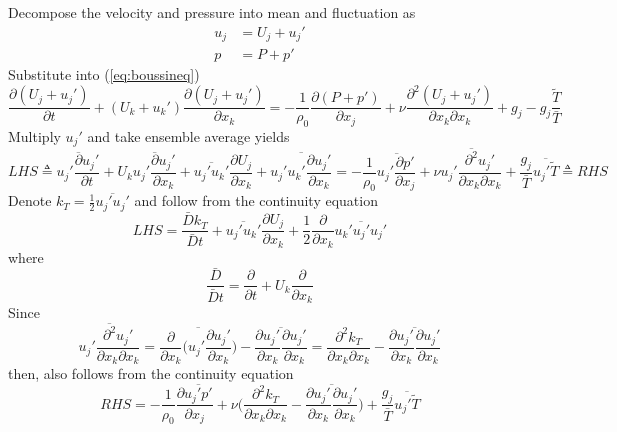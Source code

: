 \documentclass[paper=a4, fontsize=11pt]{scrartcl} %
\numberwithin{equation}{section} %
\numberwithin{figure}{section} %
\numberwithin{table}{section} %
\begin{document}
 	Decompose the velocity and pressure into mean and fluctuation as
 	\begin{equation}
 		\begin{aligned}
 			u_j & = U_j + u_j'\\
 			p & = P + p'
 		\end{aligned}
 	\end{equation}
 	Substitute into (\ref{eq:boussineq})
 	\begin{equation}
 		\frac{\partial (U_j + u_j')}{\partial t} + (U_k + u_k') \frac{\partial (U_j + u_j')}{\partial x_k} = - \frac{1}{\rho_0} \frac{\partial (P + p')}{\partial x_j} + \nu \frac{\partial^2 (U_j + u_j')}{\partial x_k \partial x_k} + g_j - g_j \frac{\tilde{T}}{\bar{T}}
 	\end{equation}
 	Multiply $u_j'$ and take ensemble average yields
 	\begin{equation}\label{eq:ea}
 		LHS \triangleq \overline{u_j' \frac{\partial u_j'}{\partial t}} + U_k \overline{u_j' \frac{\partial u_j'}{\partial x_k}} + \overline{u_j' u_k'}\frac{\partial U_j}{\partial x_k} + \overline{u_j' u_k' \frac{\partial u_j'}{\partial x_k}} = -\frac{1}{\rho_0} \overline{u_j' \frac{\partial p'}{\partial x_j}} + \nu \overline{u_j'\frac{\partial^2 u_j'}{\partial x_k \partial x_k}} + \frac{g_j}{\bar{T}}\overline{u_j' \tilde{T}} \triangleq RHS
 	\end{equation}
 	Denote $k_T = \frac{1}{2} \overline{u_j' u_j'}$ and follow from the continuity equation
 	\begin{equation}\label{eq:bl}
 		LHS = \frac{\bar{D}k_T}{\bar{D}t} + \overline{u_j' u_k'}\frac{\partial U_j}{\partial x_k} + \frac{1}{2}\frac{\partial}{\partial x_k}\overline{u_k' u_j' u_j'}
 	\end{equation}
	where
 	\begin{equation}
 	\frac{\bar{D}}{\bar{D}t} = \frac{\partial}{\partial t} + U_k \frac{\partial}{\partial x_k}
 	\end{equation}
 	Since
 	\begin{equation}
 		\overline{u_j'\frac{\partial^2 u_j'}{\partial x_k \partial x_k}} = \overline{\frac{\partial}{\partial x_k} \big(u_j'\frac{\partial u_j'}{\partial x_k}\big)} - \overline{\frac{\partial u_j'}{\partial x_k} \frac{\partial u_j'}{\partial x_k}} = \frac{\partial^2 k_T}{\partial x_k \partial x_k} - \overline{\frac{\partial u_j'}{\partial x_k} \frac{\partial u_j'}{\partial x_k}}
 	\end{equation}
 	then, also follows from the continuity equation
 	\begin{equation}\label{eq:br}
 		RHS = -\frac{1}{\rho_0} \frac{\partial \overline{u_j' p'}}{\partial x_j} + \nu \Big(\frac{\partial^2 k_T}{\partial x_k \partial x_k} - \overline{\frac{\partial u_j'}{\partial x_k} \frac{\partial u_j'}{\partial x_k}}\Big) + \frac{g_j}{\bar{T}}\overline{u_j' \tilde{T}}
 	\end{equation}
\end{document}
